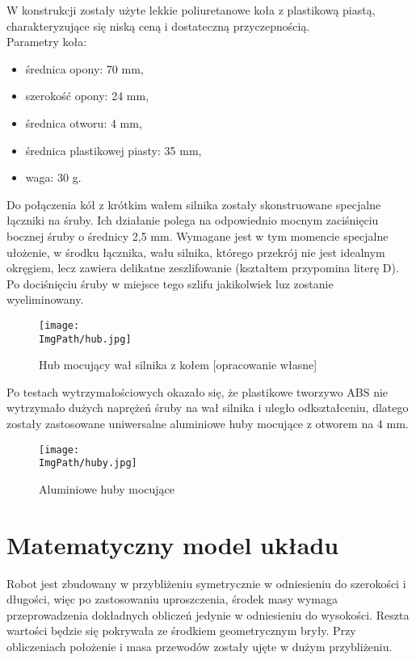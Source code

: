 \documentclass[a4paper,12pt,twoside,openany]{report}
\newcommand{\ImgPath}{.}
\begin{document}
W konstrukcji zostały użyte lekkie poliuretanowe koła z plastikową piastą, charakteryzujące się niską ceną i dostateczną przyczepnością.\\
Parametry koła:
\begin{itemize}
\item średnica opony: 70 mm,
\item szerokość opony: 24 mm,
\item średnica otworu: 4 mm,
\item średnica plastikowej piasty: 35 mm,
\item waga: 30 g.
\end{itemize}

Do połączenia kół z krótkim wałem silnika zostały skonstruowane specjalne łączniki na śruby. Ich działanie polega na odpowiednio mocnym zaciśnięciu bocznej śruby o średnicy 2,5 mm. Wymagane jest w tym momencie specjalne ułożenie, w środku łącznika, wału silnika, którego przekrój nie jest idealnym okręgiem, lecz zawiera delikatne zeszlifowanie (kształtem przypomina literę D). Po dociśnięciu śruby w miejsce tego szlifu jakikolwiek luz zostanie wyeliminowany.

\begin{figure}[!htbp]
	\begin{center}
\centering
\texttt{[image: \\ImgPath/hub.jpg]}
\end{center}
	\caption{Hub mocujący wał silnika z kołem [opracowanie własne]}
	\label{schematKomunikacji}
\end{figure}

Po testach wytrzymałościowych okazało się, że plastikowe tworzywo ABS nie wytrzymało dużych naprężeń śruby na wał silnika i uległo odkształceniu, dlatego zostały zastosowane uniwersalne aluminiowe huby mocujące z otworem na 4 mm.

\begin{figure}[!htbp]
	\begin{center}
\centering
\texttt{[image: \\ImgPath/huby.jpg]}
\end{center}
	\caption{Aluminiowe huby mocujące \cite{huby}}
	\label{schematKomunikacji}
\end{figure}

\section{Matematyczny model układu}

Robot jest zbudowany w przybliżeniu symetrycznie w odniesieniu do szerokości i długości, więc po zastosowaniu uproszczenia, środek masy wymaga przeprowadzenia dokładnych obliczeń jedynie w odniesieniu do wysokości. Reszta wartości będzie się pokrywała ze środkiem geometrycznym bryły. Przy obliczeniach położenie i masa przewodów zostały ujęte w dużym przybliżeniu.\\
\end{document}
